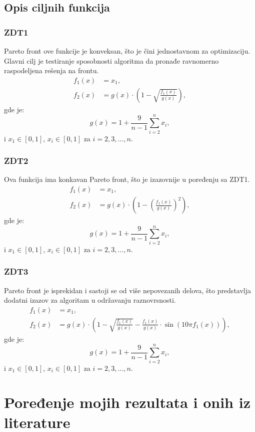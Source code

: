 \documentclass[12pt]{article}
\begin{document}
\subsection{Opis ciljnih funkcija}
\subsubsection*{ZDT1}
Pareto front ove funkcije je konveksan, što je čini jednostavnom za optimizaciju. Glavni cilj je testiranje sposobnosti algoritma da pronađe ravnomerno raspodeljena rešenja na frontu.
\[
\begin{aligned}
    f_1(x) &= x_1, \\
    f_2(x) &= g(x) \cdot \left(1 - \sqrt{\frac{f_1(x)}{g(x)}}\right),
\end{aligned}
\]
gde je:
\[
g(x) = 1 + \frac{9}{n-1} \sum_{i=2}^n x_i,
\]
i \( x_1 \in [0, 1] \), \( x_i \in [0, 1] \) za \( i = 2, 3, \dots, n \).
\[\]

\subsubsection*{ZDT2}
Ova funkcija ima konkavan Pareto front, što je izazovnije u poređenju sa ZDT1.
\[
\begin{aligned}
    f_1(x) &= x_1, \\
    f_2(x) &= g(x) \cdot \left(1 - \left(\frac{f_1(x)}{g(x)}\right)^2\right),
\end{aligned}
\]
gde je:
\[
g(x) = 1 + \frac{9}{n-1} \sum_{i=2}^n x_i,
\]
i \( x_1 \in [0, 1] \), \( x_i \in [0, 1] \) za \( i = 2, 3, \dots, n \).

\subsubsection*{ZDT3}
Pareto front je isprekidan i sastoji se od više nepovezanih delova, što predstavlja dodatni izazov za algoritam u održavanju raznovrsnosti.
\[
\begin{aligned}
    f_1(x) &= x_1, \\
    f_2(x) &= g(x) \cdot \left(1 - \sqrt{\frac{f_1(x)}{g(x)}} - \frac{f_1(x)}{g(x)} \cdot \sin(10\pi f_1(x))\right),
\end{aligned}
\]
gde je:
\[
g(x) = 1 + \frac{9}{n-1} \sum_{i=2}^n x_i,
\]
i \( x_1 \in [0, 1] \), \( x_i \in [0, 1] \) za \( i = 2, 3, \dots, n \).

\section{Poređenje mojih rezultata i onih iz literature}
\end{document}
